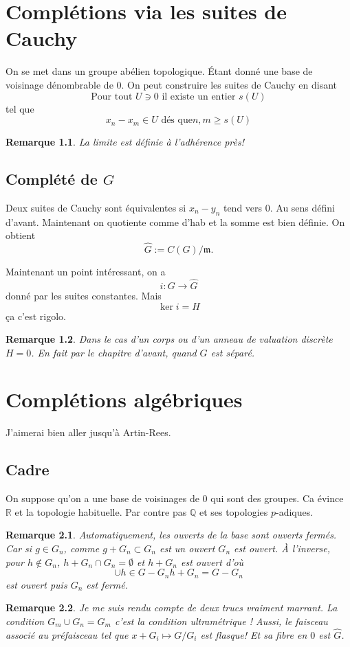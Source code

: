 \documentclass[a4paper,12pt]{book}
\newcommand{\R}{\mathbb{R}}
\newcommand{\Q}{\mathbb{Q}}
\newcommand{\m}{\mathfrak m}
\theoremstyle{plain}
\newtheorem{rem}{Remarque}
\theoremstyle{definition}
\theoremstyle{remark}
\begin{document}
\chapter{Complétions via les suites de Cauchy}
On se met dans un groupe abélien topologique.
Étant donné une base de voisinage dénombrable de $0$. On peut
construire les suites de Cauchy en disant 
\[\textrm{Pour tout $U\ni 0$ il existe un entier $s(U)$}\]
tel que 
\[x_n-x_m\in U\textrm{ dés que} n,m\geq s(U)\]
\begin{rem}
    La limite est définie à l'adhérence près!
\end{rem}
\section{Complété de $G$}
Deux suites de Cauchy sont équivalentes si $x_n-y_n$ tend
vers $0$. Au sens défini d'avant. Maintenant on quotiente comme
d'hab et la somme est bien définie. On obtient 
\[\hat G:=C(G)/\m.\]

Maintenant un point intéressant, on a 
\[i\colon G\to \hat G\]
donné par les suites constantes. Mais 
\[\ker i = H\]
ça c'est rigolo. 
\begin{rem}
    Dans le cas d'un corps ou d'un anneau de valuation discrète
    $H=0$. En fait par le chapitre d'avant, quand $G$ est
    séparé.
\end{rem}

\chapter{Complétions algébriques}
J'aimerai bien aller jusqu'à Artin-Rees.
\section{Cadre}
On suppose qu'on a une base de voisinages de $0$ qui sont des
groupes. Ca évince $\R$ et la topologie habituelle. Par contre
pas $\Q$ et ses topologies $p$-adiques.

\begin{rem}
    Automatiquement, les ouverts de la base sont ouverts
    fermés. Car si $g\in G_n$, comme $g+G_n\subset G_n$ est un
    ouvert $G_n$ est ouvert. À l'inverse, pour $h\notin G_n$,
    $h+G_n\cap G_n=\emptyset$ et 
    $h+G_n$
    est ouvert d'où
    \[\cup{h\in G-G_n} h+G_n = G-G_n\]
    est ouvert puis $G_n$ est fermé.
\end{rem}

\begin{rem}
    Je me suis rendu compte de deux trucs vraiment
    marrant. La condition $G_m\cup G_n=G_m$ c'est la
    condition ultramétrique ! Aussi, le faisceau
    associé au préfaisceau tel que $x+G_i\mapsto G/G_i$
    est flasque! Et sa fibre en $0$ est $\hat G$.
\end{rem}

\section{}




\[\textrm{}\]
\end{document}
